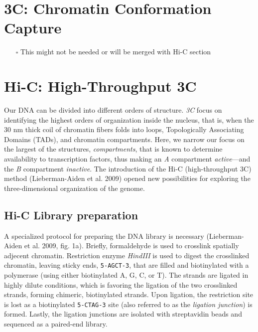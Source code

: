 \documentclass[
  11pt,
  a4paper,
]{scrbook}
\providecommand{\tightlist}{%
  \setlength{\itemsep}{0pt}\setlength{\parskip}{0pt}}\usepackage{longtable,booktabs,array}
\let\oldemph\emph
\renewcommand\emph[1]{\oldemph{\color{gray}#1}}
\begin{document}
\section{3C: Chromatin Conformation
Capture}\label{c-chromatin-conformation-capture}

\begin{itemize}
\tightlist
\item[$\square$]
  This might not be needed or will be merged with Hi-C section
\end{itemize}

\section{Hi-C: High-Throughput 3C}\label{hi-c-high-throughput-3c}

Our DNA can be divided into different orders of structure. \emph{3C}
focus on identifying the highest orders of organization inside the
nucleus, that is, when the 30 nm thick coil of chromatin fibers folds
into loops, Topologically Associating Domains (TADs), and chromatin
compartments. Here, we narrow our focus on the largest of the
structures, \emph{compartments}, that is known to determine availability
to transcription factors, thus making an \emph{A} compartment
\emph{active}---and the \emph{B} compartment \emph{inactive}. The
introduction of the Hi-C (high-throughput 3C) method (Lieberman-Aiden et
al. 2009) opened new possibilities for exploring the three-dimensional
organization of the genome.

\subsection{Hi-C Library preparation}\label{hi-c-library-preparation}

A specialized protocol for preparing the DNA library is necessary
(Lieberman-Aiden et al. 2009, fig. 1a). Briefly, formaldehyde is used to
crosslink spatially adjecent chromatin. Restriction enzyme
\emph{HindIII} is used to digest the crosslinked chromatin, leaving
sticky ends, \texttt{5-AGCT-3}, that are filled and biotinylated with a
polymerase (using either biotinylated A, G, C, or T). The strands are
ligated in highly dilute conditions, which is favoring the ligation of
the two crosslinked strands, forming chimeric, biotinylated strands.
Upon ligation, the restriction site is lost as a biotinylated
\texttt{5-CTAG-3} site (also referred to as the \emph{ligation
junction}) is formed. Lastly, the ligation junctions are isolated with
streptavidin beads and sequenced as a paired-end library.
\end{document}
